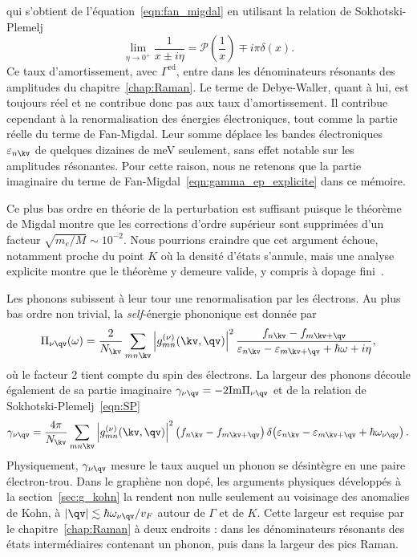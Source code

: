 qui s'obtient de l'équation~\eqref{eqn:fan_migdal} en utilisant la relation de Sokhotski-Plemelj
\begin{equation}
    \lim_{\eta\to0^+}\frac{1}{x\pm i\eta} = \mathcal{P}\left(\frac{1}{x}\right)\mp i\pi\delta(x).\label{eqn:SP}
\end{equation}
Ce taux d'amortissement, avec $\Gamma^\text{ed}$, entre dans les dénominateurs résonants des amplitudes du chapitre~\ref{chap:Raman}. Le terme de Debye-Waller, quant à lui, est toujours réel et ne contribue donc pas aux taux d'amortissement. Il contribue cependant à la renormalisation des énergies électroniques, tout comme la partie réelle du terme de Fan-Migdal. Leur somme déplace les bandes électroniques $\varepsilon_{n\kv}$ de quelques dizaines de meV seulement, sans effet notable sur les amplitudes résonantes. Pour cette raison, nous ne retenons que la partie imaginaire du terme de Fan-Migdal~\eqref{eqn:gamma_ep_explicite} dans ce mémoire.

Ce plus bas ordre en théorie de la perturbation est suffisant puisque le théorème de Migdal montre que les corrections d'ordre supérieur sont supprimées d'un facteur $\sqrt{m_e/M}\sim 10^{-2}$. Nous pourrions craindre que cet argument échoue, notamment proche du point $K$ où la densité d'états s'annule, mais une analyse explicite montre que le théorème y demeure valide, y compris à dopage fini~\cite{royMigdalsTheoremElectronphonon2014}.

Les phonons subissent à leur tour une renormalisation par les électrons. Au plus bas ordre non trivial, la \textit{self}-énergie phononique est donnée par
\begin{equation}
    \Pi_{\nu\qv}(\omega) = \frac{2}{N_\kv}\sum_{mn\kv}
    \left|g_{mn}^{(\nu)}(\kv,\qv)\right|^2
    \frac{f_{n\kv}-f_{m\kv+\qv}}{\varepsilon_{n\kv}-\varepsilon_{m\kv+\qv}+\hbar\omega+i\eta},
    \label{eqn:pi_phonon}
\end{equation}
où le facteur 2 tient compte du spin des électrons. La largeur des phonons découle également de sa partie imaginaire $\gamma_{\nu\qv} = -2\mathrm{Im}\Pi_{\nu\qv}$ et de la relation de Sokhotski-Plemelj~\eqref{eqn:SP}
\begin{equation}
        \gamma_{\nu\qv} = \frac{4\pi}{N_\kv}\sum_{mn\kv}
    \left|g_{mn}^{(\nu)}(\kv,\qv)\right|^2
    \left(f_{n\kv}-f_{m\kv+\qv}\right)
    \delta\!\left(\varepsilon_{n\kv}-\varepsilon_{m\kv+\qv}+\hbar\omega_{\nu\qv}\right).
    \label{eqn:gamma_phonon_explicite}
\end{equation}
Physiquement, $\gamma_{\nu\qv}$ mesure le taux auquel un phonon se désintègre en une paire électron-trou. Dans le graphène non dopé, les arguments physiques développés à la section~\ref{sec:g_kohn} la rendent non nulle seulement au voisinage des anomalies de Kohn, à $|\qv|\lesssim \hbar\omega_{\nu\qv}/v_F$ autour de $\Gamma$ et de $K$. Cette largeur est requise par le chapitre~\ref{chap:Raman} à deux endroits : dans les dénominateurs résonants des états intermédiaires contenant un phonon, puis dans la largeur des pics Raman.

